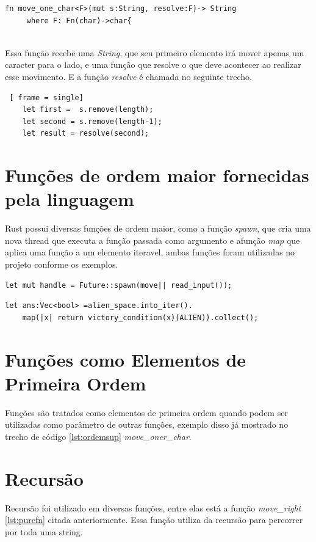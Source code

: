 \documentclass[rel_mlp]{iiufrgs}
\begin{document}
 \begin{lstlisting}[frame=single, label ={lst:ordemsup},caption={\textit{função move\_one\_char}}]
    fn move_one_char<F>(mut s:String, resolve:F)-> String
     where F: Fn(char)->char{
 
\end{lstlisting}
Essa função recebe uma \textit{String}, que seu primeiro elemento irá mover apenas um caracter para o lado, e uma função que resolve o que deve acontecer ao realizar esse movimento. E a função \textit{resolve} é chamada no seguinte trecho.
\begin{lstlisting} [ frame = single]
    let first =  s.remove(length);
    let second = s.remove(length-1);
    let result = resolve(second);
 \end{lstlisting}
 
 
 
 \section{Funções de ordem maior fornecidas pela linguagem}
 Rust possui diversas funções de ordem maior, como a função \textit{spawn}, que cria uma nova thread que executa a função passada como argumento e afunção \textit{map} que aplica uma função a um elemento iteravel, ambas funções foram utilizadas no projeto conforme os exemplos.
 
 \begin{lstlisting}[frame=single]
    let mut handle = Future::spawn(move|| read_input());
 \end{lstlisting}
 \begin{lstlisting}[frame=single]
let ans:Vec<bool> =alien_space.into_iter().
    map(|x| return victory_condition(x)(ALIEN)).collect();
 \end{lstlisting}

 \section{Funções como Elementos de Primeira Ordem}
 Funções são tratados como elementos de primeira ordem quando podem ser utilizadas como parâmetro de outras funções, exemplo disso já mostrado no trecho de código \ref{lst:ordemsup} \textit{move\_oner\_char}.
 
 
\section{Recursão}
Recursão foi utilizado em diversas funções, entre elas está a função \textit{move\_right} \ref{lst:purefn} citada anteriormente. Essa função utiliza da recursão para percorrer por toda uma string.
\end{document}

